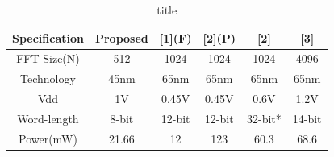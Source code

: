 \documentclass[12pt,a4paper]{article}
\begin{document}
\begin{table}[htbp]
\centering
\caption{title}
\label{tab1}
    \begin{tabular}{cccccc}
        \hline
        Specification &Proposed &[1](F) &[2](P) &[2]      &[3] \\
        \hline
        FFT Size(N)   &512      &1024   &1024   &1024     &4096   \\
        Technology    &45nm     &65nm   &65nm   &65nm     &65nm   \\
        Vdd           &1V       &0.45V  &0.45V  &0.6V     &1.2V   \\
        Word-length   &8-bit    &12-bit &12-bit &32-bit*  &14-bit  \\
        Power(mW)     &21.66    &12     &123    &60.3     &68.6    \\
        \hline
    \end{tabular}
\end{table}
\end{document}

